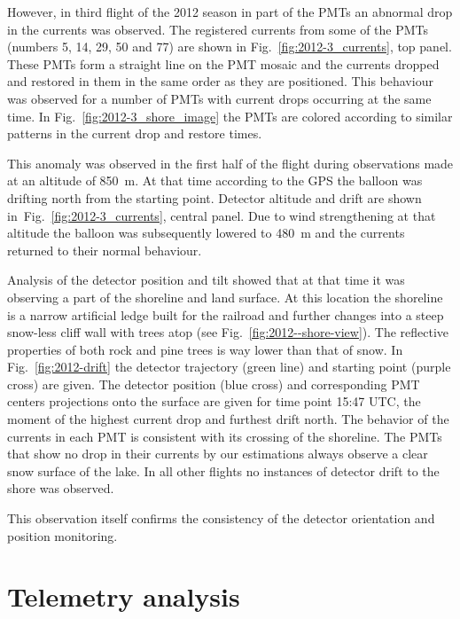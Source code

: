 \documentclass[final,5p,times,twocolumn]{elsarticle}
\begin{document}
However, in third flight of the 2012 season in part of the PMTs an abnormal drop in the currents was observed.
The registered currents from some of the PMTs (numbers 5, 14, 29, 50 and 77) are shown in Fig.~\ref{fig:2012-3_currents}, top panel. These PMTs form a straight line on the PMT mosaic and the currents dropped and restored in them in the same order as they are positioned. This behaviour was observed for a number of PMTs with current drops occurring at the same time. In Fig.~\ref{fig:2012-3_shore_image} the PMTs are colored according to similar patterns in the current drop and restore times.

This anomaly was observed in the first half of the flight during observations made at an altitude of 850~m. At that time according to the GPS the balloon was drifting north from the starting point. Detector altitude and drift are shown in~Fig.~\ref{fig:2012-3_currents}, central panel. Due to wind strengthening at that altitude the balloon was subsequently lowered to 480~m and the currents returned to their normal behaviour. 

Analysis of the detector position and tilt showed that at that time it was observing a part of the shoreline and land surface. At this location the shoreline is a narrow artificial ledge built for the railroad and further changes into a steep snow-less cliff wall with trees atop (see Fig.~\ref{fig:2012--shore-view}). The reflective properties of both rock and pine trees is way lower than that of snow. In Fig.~\ref{fig:2012-drift} the detector trajectory (green line) and starting point (purple cross) are given. The detector position (blue cross) and corresponding PMT centers projections onto the surface are given for time point 15:47 UTC, the moment of the highest current drop and furthest drift north.  The behavior of the currents in each PMT is consistent with its crossing of the shoreline. The PMTs that show no drop in their currents by our estimations always observe a clear snow surface of the lake. In all other flights no instances of detector drift to the shore was observed.

This observation itself confirms the consistency of the detector orientation and position monitoring.

\section{Telemetry analysis}
\end{document}
